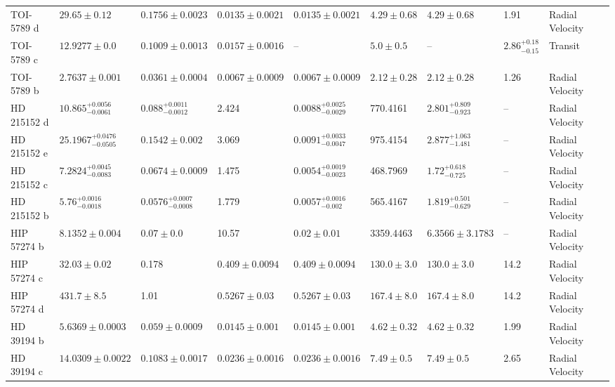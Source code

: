 \begin{tabular}{llllllllll}
TOI-5789 d & $29.65 \pm 0.12$ & $0.1756 \pm 0.0023$ & $0.0135 \pm 0.0021$ & $0.0135 \pm 0.0021$ & $4.29 \pm 0.68$ & $4.29 \pm 0.68$ & 1.91 & Radial Velocity & \cite{BONOMO_ET_AL_2026} \\
TOI-5789 c & $12.9277 \pm 0.0$ & $0.1009 \pm 0.0013$ & $0.0157 \pm 0.0016$ & -- & $5.0 \pm 0.5$ & -- & $2.86^{+0.18}_{-0.15}$ & Transit & \cite{BONOMO_ET_AL_2026} \\
TOI-5789 b & $2.7637 \pm 0.001$ & $0.0361 \pm 0.0004$ & $0.0067 \pm 0.0009$ & $0.0067 \pm 0.0009$ & $2.12 \pm 0.28$ & $2.12 \pm 0.28$ & 1.26 & Radial Velocity & \cite{BONOMO_ET_AL_2026} \\
HD 215152 d & $10.865^{+0.0056}_{-0.0061}$ & $0.088^{+0.0011}_{-0.0012}$ & 2.424 & $0.0088^{+0.0025}_{-0.0029}$ & 770.4161 & $2.801^{+0.809}_{-0.923}$ & -- & Radial Velocity & \cite{DELISLE_ET_AL__2018} \\
HD 215152 e & $25.1967^{+0.0476}_{-0.0505}$ & $0.1542 \pm 0.002$ & 3.069 & $0.0091^{+0.0033}_{-0.0047}$ & 975.4154 & $2.877^{+1.063}_{-1.481}$ & -- & Radial Velocity & \cite{DELISLE_ET_AL__2018} \\
HD 215152 c & $7.2824^{+0.0045}_{-0.0083}$ & $0.0674 \pm 0.0009$ & 1.475 & $0.0054^{+0.0019}_{-0.0023}$ & 468.7969 & $1.72^{+0.618}_{-0.725}$ & -- & Radial Velocity & \cite{DELISLE_ET_AL__2018} \\
HD 215152 b & $5.76^{+0.0016}_{-0.0018}$ & $0.0576^{+0.0007}_{-0.0008}$ & 1.779 & $0.0057^{+0.0016}_{-0.002}$ & 565.4167 & $1.819^{+0.501}_{-0.629}$ & -- & Radial Velocity & \cite{DELISLE_ET_AL__2018} \\
HIP 57274 b & $8.1352 \pm 0.004$ & $0.07 \pm 0.0$ & 10.57 & $0.02 \pm 0.01$ & 3359.4463 & $6.3566 \pm 3.1783$ & -- & Radial Velocity & \cite{STASSUN_ET_AL__2017} \\
HIP 57274 c & $32.03 \pm 0.02$ & 0.178 & $0.409 \pm 0.0094$ & $0.409 \pm 0.0094$ & $130.0 \pm 3.0$ & $130.0 \pm 3.0$ & 14.2 & Radial Velocity & \cite{FISCHER_ET_AL__2012} \\
HIP 57274 d & $431.7 \pm 8.5$ & 1.01 & $0.5267 \pm 0.03$ & $0.5267 \pm 0.03$ & $167.4 \pm 8.0$ & $167.4 \pm 8.0$ & 14.2 & Radial Velocity & \cite{FISCHER_ET_AL__2012} \\
HD 39194 b & $5.6369 \pm 0.0003$ & $0.059 \pm 0.0009$ & $0.0145 \pm 0.001$ & $0.0145 \pm 0.001$ & $4.62 \pm 0.32$ & $4.62 \pm 0.32$ & 1.99 & Radial Velocity & \cite{STANDING_ET_AL_2026} \\
HD 39194 c & $14.0309 \pm 0.0022$ & $0.1083 \pm 0.0017$ & $0.0236 \pm 0.0016$ & $0.0236 \pm 0.0016$ & $7.49 \pm 0.5$ & $7.49 \pm 0.5$ & 2.65 & Radial Velocity & \cite{STANDING_ET_AL_2026} \\

\end{tabular}
